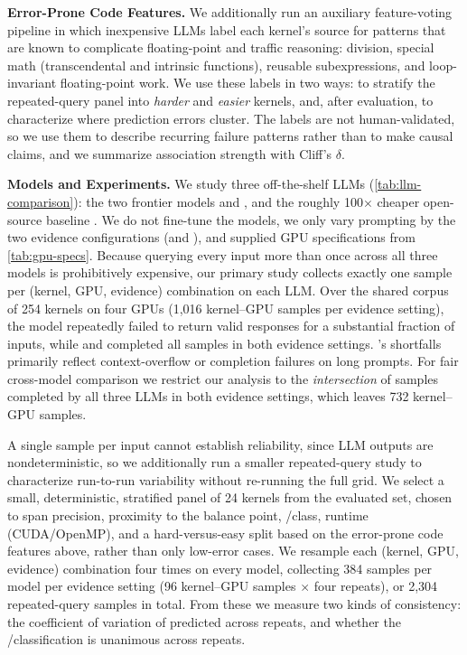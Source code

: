 \noindent\textbf{Error-Prone Code Features.}
We additionally run an auxiliary feature-voting pipeline in which inexpensive LLMs label each kernel's source for patterns that are known to complicate floating-point and traffic reasoning: division, special math (transcendental and intrinsic functions), reusable subexpressions, and loop-invariant floating-point work.
We use these labels in two ways: to stratify the repeated-query panel into \textit{harder} and \textit{easier} kernels, and, after evaluation, to characterize where prediction errors cluster.
The labels are not human-validated, so we use them to describe recurring failure patterns rather than to make causal claims, and we summarize association strength with Cliff's $\delta$.









\noindent\textbf{Models and Experiments.}
We study three off-the-shelf LLMs (\autoref{tab:llm-comparison}): the two frontier models \gptfivefour and \opus, and the roughly 100$\times$ cheaper open-source baseline \gptoss.
We do not fine-tune the models, we only vary prompting by the two evidence configurations (\sourceonly and \sourcesass), and supplied GPU specifications from \autoref{tab:gpu-specs}. 
Because querying every input more than once across all three models is prohibitively expensive, our primary study collects exactly one sample per (kernel, GPU, evidence) combination on each LLM.
Over the shared corpus of 254 kernels on four GPUs (1{,}016 kernel--GPU samples per evidence setting), the \gptoss model repeatedly failed to return valid responses for a substantial fraction of inputs, while \gptfivefour and \opus completed all samples in both evidence settings.
\gptoss's shortfalls primarily reflect context-overflow or completion failures on long prompts.
For fair cross-model comparison we restrict our analysis to the \emph{intersection} of samples completed by all three LLMs in both evidence settings, which leaves 732 kernel--GPU samples.

A single sample per input cannot establish reliability, since LLM outputs are nondeterministic, so we additionally run a smaller repeated-query study to characterize run-to-run variability without re-running the full grid.
We select a small, deterministic, stratified panel of 24 kernels from the evaluated set, chosen to span precision, proximity to the balance point, \bandwidthbound/\computebound class, runtime (CUDA/OpenMP), and a hard-versus-easy split based on the error-prone code features above, rather than only low-error cases. 
We resample each (kernel, GPU, evidence) combination four times on every model, collecting 384 samples per model per evidence setting (96 kernel--GPU samples $\times$ four repeats), or 2{,}304 repeated-query samples in total.
From these we measure two kinds of consistency: the coefficient of variation of predicted \rai across repeats, and whether the \bandwidthbound/\computebound classification is unanimous across repeats.






